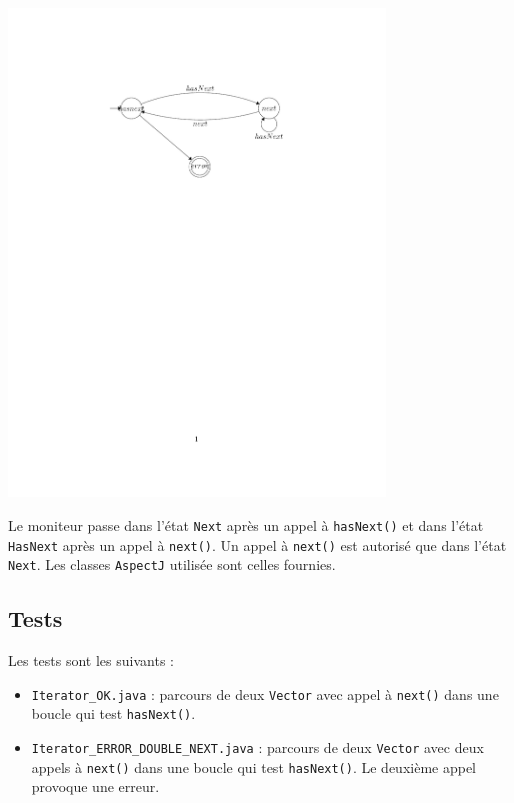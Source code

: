 \documentclass{article}
\begin{document}
\begin{center}
\includegraphics[width=10cm, clip, trim=5.5cm 18cm 5.5cm
4cm]{iterator.pdf}
\end{center}

Le moniteur passe dans l'état \texttt{Next} après un appel à \texttt{hasNext()}
et dans l'état \texttt{HasNext} après un appel à \texttt{next()}. Un appel à
\texttt{next()} est autorisé que dans l'état \texttt{Next}. Les classes
\texttt{AspectJ} utilisée sont celles fournies.

\subsection{Tests}

Les tests sont les suivants :

\begin{itemize}
  \item \texttt{Iterator\_OK.java} : parcours de deux \texttt{Vector} avec appel
  à \texttt{next()} dans une boucle qui test \texttt{hasNext()}.
  \item \texttt{Iterator\_ERROR\_DOUBLE\_NEXT.java} : parcours de deux
  \texttt{Vector} avec deux appels à \texttt{next()} dans une boucle qui test
  \texttt{hasNext()}. Le deuxième appel provoque une erreur.
\end{itemize}
\end{document}

